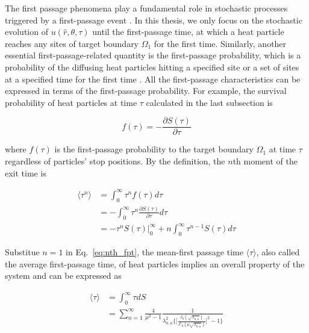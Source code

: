 The first passage phenomena play a fundamental role in stochastic
processes triggered by a first-passage event
\cite{van1992stochastic}. In this thesis, we only focus on the
stochastic evolution of $u(\hat r, \theta, \tau)$ until the
first-passage time, at which a heat particle reaches any sites of
target boundary $\Omega_1$ for the first time. Similarly, another
essential first-passage-related quantity is the first-passage
probability, which is a probability of the diffusing heat particles
hitting a specified site or a set of sites at a specified time for the
first time \cite{redner2001guide}. All the first-passage
characteristics can be expressed in terms of the first-passage
probability. For example, the survival probability of heat particles
at time $\tau$ calculated in the last subsection is

\begin{equation}\label{eq:pdf_fpt}
  f(\tau) = - \frac{\partial S(\tau)}{\partial \tau}
\end{equation}

where $f(\tau)$ is the first-passage probability to the target
boundary $\Omega_1$ at time $\tau$ regardless of particles' stop
positions. By the definition, the $n$th moment of the exit time
\cite{redner2001guide} is

\begin{equation}\label{eq:nth_fpt}
  \begin{split}
    \langle \tau^n \rangle &= \int_{0}^{\infty} \tau^n f(\tau) d\tau \\
    &= - \int_{0}^{\infty} \tau^n  \frac{\partial S(\tau)}{\partial \tau} d\tau \\
    &= -\tau^n S(\tau) |_{0}^{\infty} + n\int_{0}^{\infty} \tau^{n-1}S(\tau) d\tau
\end{split}
\end{equation}


Substitue $n=1$ in Eq.~\ref{eq:nth_fpt}, the mean-first passage time
$\langle \tau \rangle$, also called the average first-passage time, of
heat particles implies an overall property of the system and can be
expressed as

\begin{equation}\label{eq:mfpt}
  \begin{split}
    \langle \tau \rangle &= \int_{0}^{\infty} \tau dS\\
    &=\sum_{n=1}^{\infty} \frac{4}{\mu^2 - 1}
    \frac{1}{\lambda^2_{0,n}\bigg\{\bigg[\frac{J_0(\sqrt{\lambda_{0,n}})}{J'_0(\mu\sqrt{\lambda_{0,n}})}\bigg]^2
      -1\bigg\}}
  \end{split}
\end{equation}

